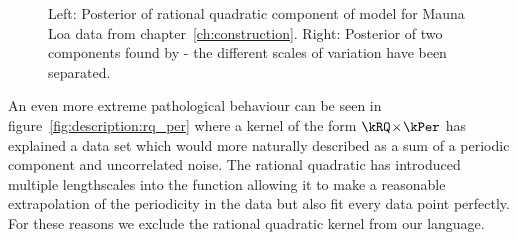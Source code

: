\begin{figure}[ht]
\centering
{}
\caption[Demonstration of rational quadratic kernel capturing multiple scales of variation on Mauna Loa data.]{
Left: Posterior of rational quadratic component of model for Mauna Loa data from chapter~\ref{ch:construction}.
Right: Posterior of two components found by \procedurename{} - the different scales of variation have been separated.
}
\label{fig:rq}
\end{figure}

An even more extreme pathological behaviour can be seen in figure~\ref{fig:description:rq_per} where a kernel of the form $\kRQ \kerntimes \kPer$ has explained a data set which \procedurename{} would more naturally described as a sum of a periodic component and uncorrelated noise.
The rational quadratic has introduced multiple lengthscales into the function allowing it to make a reasonable extrapolation of the periodicity in the data but also fit every data point perfectly.
For these reasons we exclude the rational quadratic kernel from our language.

